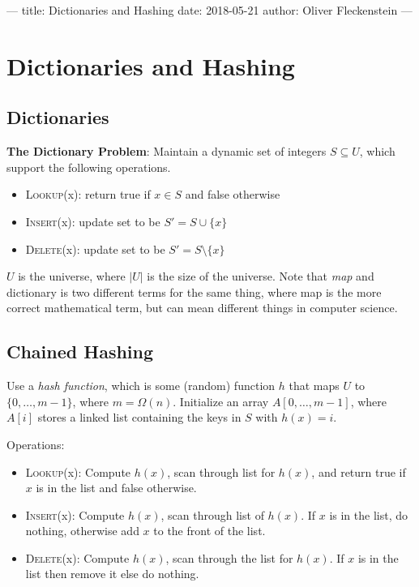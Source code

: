 ---
title: Dictionaries and Hashing
date: 2018-05-21
author: Oliver Fleckenstein
---
\chapter{Dictionaries and Hashing}

    \section{Dictionaries}
        \textbf{The Dictionary Problem}: Maintain a dynamic set of integers $S \subseteq U$, which support the following operations.

        \begin{itemize}
            \item \textsc{Lookup}(x): return true if $x \in S$ and false otherwise
            \item \textsc{Insert}(x): update set to be $S' = S \cup \{x\}$
            \item \textsc{Delete}(x): update set to be $S' = S \setminus \{x\}$
        \end{itemize}

        $U$ is the universe, where $|U|$ is the size of the universe.
        Note that \emph{map} and dictionary is two different terms for the same thing, where map is the more correct mathematical term, but can mean different things in computer science.

    \section{Chained Hashing}
        Use a \emph{hash function}, which is some (random) function $h$ that maps $U$ to $\{0, \ldots, m-1\}$, where $m = \Omega(n)$.
        Initialize an array $A[0, \ldots, m-1]$, where $A[i]$ stores a linked list containing the keys in $S$ with $h(x) = i$.

        Operations:
        \begin{itemize}
            \item \textsc{Lookup}(x): Compute $h(x)$, scan through list for $h(x)$, and return true if $x$ is in the list and false otherwise.
            \item \textsc{Insert}(x): Compute $h(x)$, scan through list of $h(x)$. If $x$ is in the list, do nothing, otherwise add $x$ to the front of the list.
            \item \textsc{Delete}(x): Compute $h(x)$, scan through the list for $h(x)$. If $x$ is in the list then remove it else do nothing.
        \end{itemize}

